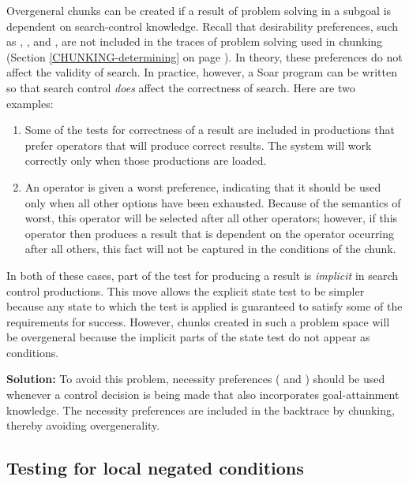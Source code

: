 Overgeneral chunks can be created if a result of problem solving in a subgoal
is dependent on search-control knowledge. Recall that desirability
preferences, such as , , and , are not
included in the traces of problem solving used in chunking (Section
\ref{CHUNKING-determining} on page \pageref{CHUNKING-determining}). In theory,
these preferences do not affect the validity of search. In practice, however,
a Soar program can be written so that search control \emph{does} affect the
correctness of search. Here are two examples:\vspace{-12pt}

\begin{enumerate} 
\item Some of the tests for correctness of a result are included in
	productions that prefer operators that will produce correct results.
  	The system will work correctly only when those productions are loaded.\vspace{-8pt}
\item An operator is given a worst preference, indicating that it
  	should be used only when all other options have been exhausted.
  	Because of the semantics of worst, this operator will be selected
  	after all other operators; however, if this operator then produces a
  	result that is dependent on the operator occurring after all others,
  	this fact will not be captured in the conditions of the chunk.
\end{enumerate}
 
 

In both of these cases, part of the test for producing a result is {\em
implicit} in search control productions. This move allows the explicit state
test to be simpler because any state to which the test is applied is
guaranteed to satisfy some of the requirements for success. However, chunks
created in such a problem space will be overgeneral because the implicit parts
of the state test do not appear as conditions. 

\textbf{Solution:} To avoid this problem, necessity preferences
( and ) should be used whenever a control
decision is being made that also incorporates goal-attainment knowledge.  The
necessity preferences are included in the backtrace by chunking, thereby
avoiding overgenerality.

\subsection{Testing for local negated conditions}

